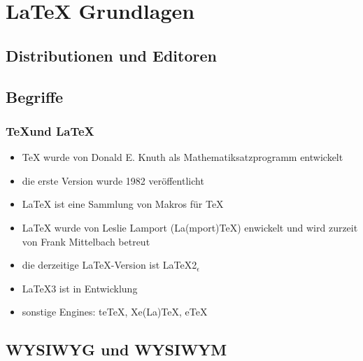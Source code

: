 \documentclass[xelatex,hyperref=xdvipdfmx,11pt]{beamer}
\begin{document}




\section{\LaTeX{} Grundlagen}
\label{sec:grundlagen}


\subsection{Distributionen und Editoren}
\label{sec:install}

\frame{


}


\subsection{Begriffe}
\label{sec:begriffe}

\begin{frame}
\frametitle{\TeX und \LaTeX}

\begin{itemize}
\item \TeX{} wurde von Donald E. Knuth als Mathematiksatzprogramm entwickelt
\item die erste Version wurde 1982 veröffentlicht
\item \LaTeX{} ist eine Sammlung von Makros für \TeX
\item \LaTeX{} wurde von Leslie Lamport (La(mport)\TeX ) enwickelt und wird zurzeit
     von Frank Mittelbach betreut
   \item die derzeitige \LaTeX -Version ist LaTeX2$_{\epsilon}$
\item \LaTeX 3 ist in Entwicklung
\item sonstige Engines: teTeX, Xe(La)\TeX{}, eTeX
\end{itemize}
\end{frame}


\subsection{WYSIWYG und WYSIWYM}
\label{sec:wysiwym}
\end{document}
